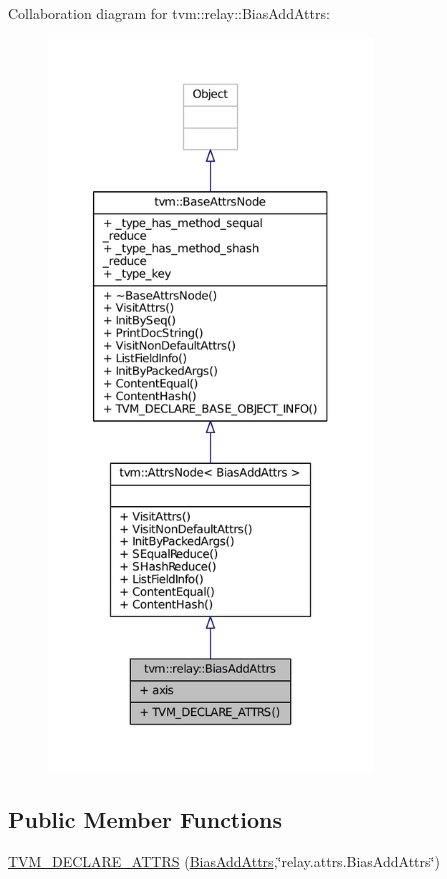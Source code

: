 Collaboration diagram for tvm\+:\+:relay\+:\+:Bias\+Add\+Attrs\+:
\nopagebreak
\begin{figure}[H]
\begin{center}
\leavevmode
\includegraphics[height=550pt]{structtvm_1_1relay_1_1BiasAddAttrs__coll__graph}
\end{center}
\end{figure}
\subsection*{Public Member Functions}
\begin{DoxyCompactItemize}
\item 
\hyperlink{structtvm_1_1relay_1_1BiasAddAttrs_af72abc37eede66226f1d94c678720da4}{T\+V\+M\+\_\+\+D\+E\+C\+L\+A\+R\+E\+\_\+\+A\+T\+T\+RS} (\hyperlink{structtvm_1_1relay_1_1BiasAddAttrs}{Bias\+Add\+Attrs},\char`\"{}relay.\+attrs.\+Bias\+Add\+Attrs\char`\"{})
\end{DoxyCompactItemize}
